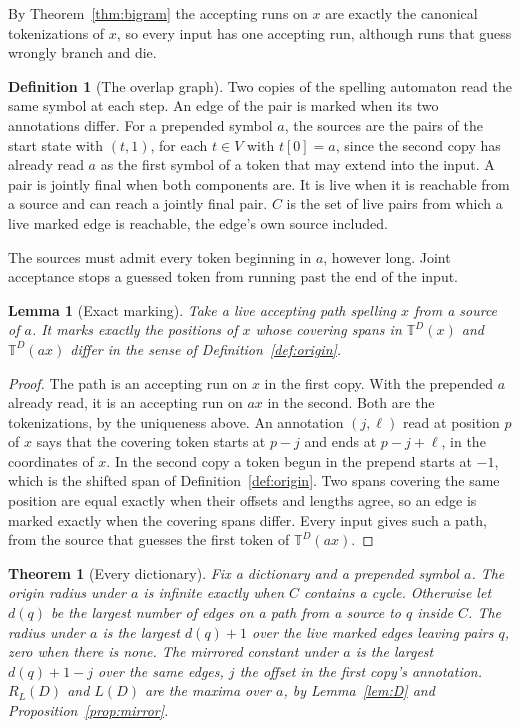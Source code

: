 \documentclass[11pt,a4paper]{article}
\theoremstyle{definition}
\newtheorem{definition}{Definition}
\theoremstyle{plain}
\newtheorem{lemma}{Lemma}
\newtheorem{theorem}{Theorem}
\newcommand{\T}{\mathbb{T}}
\newcommand{\ripple}{R_{L}}
\begin{document}
By Theorem~\ref{thm:bigram} the accepting runs on \(x\) are exactly the canonical tokenizations of \(x\), so every input
has one accepting run, although runs that guess wrongly branch and die.

\begin{definition}[The overlap graph]\label{def:overlap}
Two copies of the spelling automaton read the same symbol at each step. An edge of the pair is marked when its two
annotations differ. For a prepended symbol \(a\), the sources are the pairs of the start state with \((t, 1)\), for each
\(t \in V\) with \(t[0] = a\), since the second copy has already read \(a\) as the first symbol of a token that may
extend into the input. A pair is jointly final when both components are. It is live when it is reachable from a source
and can reach a jointly final pair. \(C\) is the set of live pairs from which a live marked edge is reachable, the
edge's own source included.
\end{definition}

The sources must admit every token beginning in \(a\), however long. Joint acceptance stops a guessed token from running
past the end of the input.

\begin{lemma}[Exact marking]\label{lem:mark}
Take a live accepting path spelling \(x\) from a source of \(a\). It marks exactly the positions of \(x\) whose covering
spans in \(\T^D(x)\) and \(\T^D(ax)\) differ in the sense of Definition~\ref{def:origin}.
\end{lemma}

\begin{proof}
The path is an accepting run on \(x\) in the first copy. With the prepended \(a\) already read, it is an accepting run
on \(ax\) in the second. Both are the tokenizations, by the uniqueness above. An annotation \((j, \ell)\) read at
position \(p\) of \(x\) says that the covering token starts at \(p - j\) and ends at \(p - j + \ell\), in the
coordinates of \(x\). In the second copy a token begun in the prepend starts at \(-1\), which is the shifted span of
Definition~\ref{def:origin}. Two spans covering the same position are equal exactly when their offsets and lengths
agree, so an edge is marked exactly when the covering spans differ. Every input gives such a path, from the source that
guesses the first token of \(\T^D(ax)\).
\end{proof}

\begin{theorem}[Every dictionary]\label{thm:overlap}
Fix a dictionary and a prepended symbol \(a\). The origin radius under \(a\) is infinite exactly when \(C\) contains a
cycle. Otherwise let \(d(q)\) be the largest number of edges on a path from a source to \(q\) inside \(C\). The radius
under \(a\) is the largest \(d(q) + 1\) over the live marked edges leaving pairs \(q\), zero when there is none. The
mirrored constant under \(a\) is the largest \(d(q) + 1 - j\) over the same edges, \(j\) the offset in the first copy's
annotation. \(\ripple(D)\) and \(L(D)\) are the maxima over \(a\), by Lemma~\ref{lem:D} and
Proposition~\ref{prop:mirror}.
\end{theorem}
\end{document}
